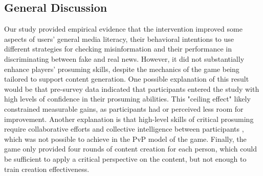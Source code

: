 \subsection{General Discussion}
Our
study provided empirical evidence that the intervention improved some aspects of users' general media literacy, their behavioral intentions to use different strategies for checking misinformation and their performance in discriminating between fake and real news. However, it did not substantially enhance players’ prosuming skills, despite the mechanics of the game being tailored to support content generation. One possible explanation of this result would be that pre-survey data indicated that participants %
entered the study with high levels of confidence in their prosuming abilities. This "ceiling effect" likely constrained measurable gains, as participants had or perceived less room for improvement.
Another explanation is that high-level skills of critical prosuming require collaborative efforts and collective intelligence between participants \cite{lin2013understanding}, which was not possible to achieve in the PvP model of the game. Finally, the game only provided four rounds of content creation for each person, which could be sufficient to apply a critical perspective on the content, but not enough to
train creation effectiveness.

